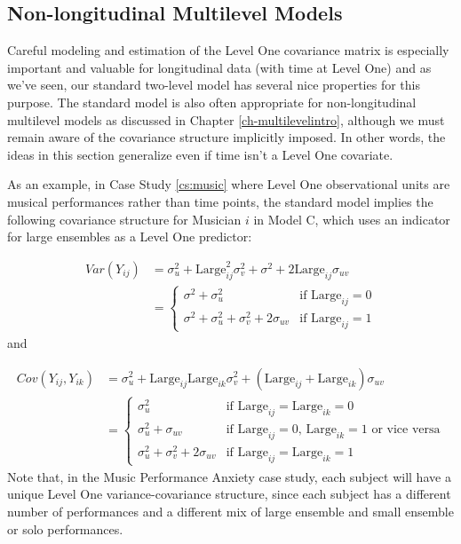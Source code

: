 \documentclass[
]{krantz}
\begin{document}
\hypertarget{non-longitudinal-multilevel-models}{%
\subsection{Non-longitudinal Multilevel Models}\label{non-longitudinal-multilevel-models}}

Careful modeling and estimation of the Level One covariance matrix is especially important and valuable for longitudinal data (with time at Level One) and as we've seen, our standard two-level model has several nice properties for this purpose. The standard model is also often appropriate for non-longitudinal multilevel models as discussed in Chapter \ref{ch-multilevelintro}, although we must remain aware of the covariance structure implicitly imposed. In other words, the ideas in this section generalize even if time isn't a Level One covariate.

As an example, in Case Study \ref{cs:music} where Level One observational units are musical performances rather than time points, the standard model implies the following covariance structure for Musician \(i\) in Model C, which uses an indicator for large ensembles as a Level One predictor:

\begin{align*}
Var(Y_{ij}) & = \sigma_{u}^{2} + \textrm{Large}^{2}_{ij} \sigma_{v}^{2} + \sigma^{2} + 2\textrm{Large}_{ij}\sigma_{uv} \\
 & = \left\{ \begin{array}{ll}
                 \sigma^{2} + \sigma_{u}^{2} & \mbox{if $\textrm{Large}_{ij}=0$} \\
                 \sigma^{2} + \sigma_{u}^{2} + \sigma_{v}^{2} + 2\sigma_{uv} & \mbox{if $\textrm{Large}_{ij}=1$}
               \end{array}
       \right.
\end{align*}
\noindent and

\begin{align*}
Cov(Y_{ij},Y_{ik}) & = \sigma_{u}^{2} + \textrm{Large}_{ij}\textrm{Large}_{ik} \sigma_{v}^{2} + (\textrm{Large}_{ij} + 
  \textrm{Large}_{ik}) \sigma_{uv} \\
 & = \left\{ \begin{array}{ll}
                 \sigma_{u}^{2} & \mbox{if $\textrm{Large}_{ij}=\textrm{Large}_{ik}=0$} \\
                 \sigma_{u}^{2} + \sigma_{uv} & \mbox{if $\textrm{Large}_{ij}=0$, $\textrm{Large}_{ik}=1$ or vice versa} \\
                 \sigma_{u}^{2} + \sigma_{v}^{2} + 2\sigma_{uv} & \mbox{if $\textrm{Large}_{ij}=\textrm{Large}_{ik}=1$}
               \end{array}
       \right.
\end{align*}
Note that, in the Music Performance Anxiety case study, each subject will have a unique Level One variance-covariance structure, since each subject has a different number of performances and a different mix of large ensemble and small ensemble or solo performances.
\end{document}
